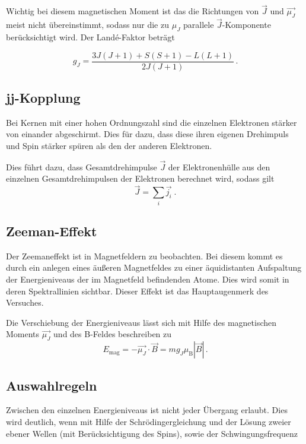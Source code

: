 \noindent
Wichtig bei diesem magnetischen Moment ist das die Richtungen von $\vec{J}$ und $\vec{\mu_J}$ meist nicht übereinstimmt, sodass
nur die zu $\mu_J$ parallele $\vec{J}$-Komponente berücksichtigt wird. Der Landé-Faktor beträgt 

\begin{equation}
    g_J = \frac{3J(J+1) + S(S+1) - L(L+1)}{2J(J+1)}\, .
    \label{eqn:lande}
\end{equation}


\subsection{jj-Kopplung}

Bei Kernen mit einer hohen Ordnungszahl sind die einzelnen Elektronen stärker von einander abgeschirmt. Dies für dazu, dass diese ihren eigenen Drehimpuls und Spin stärker 
spüren als den der anderen Elektronen. 

\noindent
Dies führt dazu, dass Gesamtdrehimpulse $\vec{J}$ der Elektronenhülle aus den einzelnen Gesamtdrehimpulsen der Elektronen berechnet wird, sodass gilt
\begin{equation}
    \vec{J} = \sum_i \vec{j_i} \; .
\end{equation}



\subsection{Zeeman-Effekt}
Der Zeemaneffekt ist in Magnetfeldern zu beobachten. Bei diesem kommt es durch ein anlegen eines äußeren Magnetfeldes zu einer äquidistanten Aufspaltung der Energieniveaus der im
Magnetfeld befindenden Atome. Dies wird somit in deren Spektrallinien sichtbar. Dieser Effekt ist das Hauptaugenmerk des Versuches.

\noindent
Die Verschiebung der Energieniveaus lässt sich mit Hilfe des magnetischen Moments $\vec{\mu_J}$ und des B-Feldes beschreiben zu 
\begin{equation}
    E_\text{mag} = - \vec{\mu_J} \cdot \vec{B} = m g_J \mu_\text{B} |\vec{B}| \, .
    \label{eqn:energie}
\end{equation} 

\subsection{Auswahlregeln}
Zwischen den einzelnen Energieniveaus ist nicht jeder Übergang erlaubt. Dies wird deutlich, wenn mit Hilfe der Schrödingergleichung und der Lösung zweier ebener Wellen (mit Berücksichtigung
des Spins), sowie der Schwingungsfrequenz

